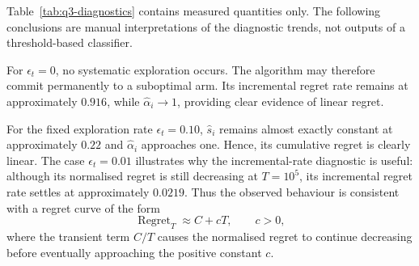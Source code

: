 \begin{table}[H]
\centering
\caption{Measured multi-horizon numerical diagnostics for the six
$\epsilon$-greedy schedules. Interpretations are given separately in the
text.}
\label{tab:q3-diagnostics}
\end{table}

Table~\ref{tab:q3-diagnostics} contains measured quantities only. The
following conclusions are manual interpretations of the diagnostic trends,
not outputs of a threshold-based classifier.

For $\epsilon_t=0$, no systematic exploration occurs. The algorithm may
therefore commit permanently to a suboptimal arm. Its incremental regret
rate remains at approximately $0.916$, while
$\widehat{\alpha}_i\to1$, providing clear evidence of linear regret.

For the fixed exploration rate $\epsilon_t=0.10$,
$\widehat{s}_i$ remains almost exactly constant at approximately $0.22$ and
$\widehat{\alpha}_i$ approaches one. Hence, its cumulative regret is clearly
linear. The case $\epsilon_t=0.01$ illustrates why the incremental-rate
diagnostic is useful: although its normalised regret is still decreasing at
$T=10^5$, its incremental regret rate settles at approximately $0.0219$.
Thus the observed behaviour is consistent with a regret curve of the form
\[
    \operatorname{Regret}_T
    \approx
    C+cT,
    \qquad c>0,
\]
where the transient term $C/T$ causes the normalised regret to continue
decreasing before eventually approaching the positive constant $c$.

